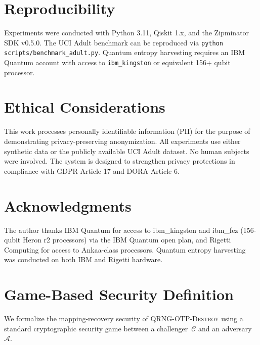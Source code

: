 \documentclass[journal]{IEEEtran}
\begin{document}
\section*{Reproducibility}
Experiments were conducted with Python 3.11, Qiskit 1.x, and the Zipminator SDK v0.5.0.
The UCI Adult benchmark can be reproduced via \texttt{python scripts/benchmark\_adult.py}.
Quantum entropy harvesting requires an IBM Quantum account with access to
\texttt{ibm\_kingston} or equivalent 156+ qubit processor.

\section*{Ethical Considerations}
This work processes personally identifiable information (PII) for the purpose of
demonstrating privacy-preserving anonymization. All experiments use either synthetic
data or the publicly available UCI Adult dataset. No human subjects were involved.
The system is designed to strengthen privacy protections in compliance with
GDPR Article 17 and DORA Article 6.

\section*{Acknowledgments}
The author thanks IBM Quantum for access to ibm\_kingston and ibm\_fez (156-qubit Heron r2 processors) via the IBM Quantum open plan, and Rigetti Computing for access to Ankaa-class processors. Quantum entropy harvesting was conducted on both IBM and Rigetti hardware.

\appendix
\section{Game-Based Security Definition}
\label{app:security-game}

We formalize the mapping-recovery security of \textsc{QRNG-OTP-Destroy} using a standard cryptographic security game between a challenger~$\mathcal{C}$ and an adversary~$\mathcal{A}$.
\end{document}
